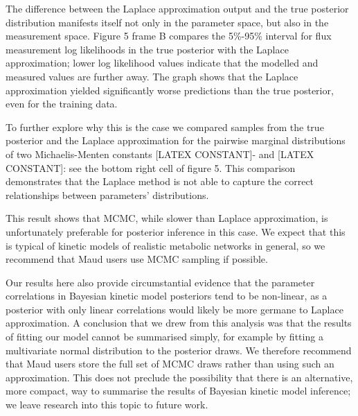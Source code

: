 \documentclass[journal=,manuscript=]{achemso}
\begin{document}
The difference between the Laplace approximation output and the true
posterior distribution manifests itself not only in the parameter space,
but also in the measurement space. Figure 5 frame B compares the
5\%-95\% interval for flux measurement log likelihoods in the true
posterior with the Laplace approximation; lower log likelihood values
indicate that the modelled and measured values are further away. The
graph shows that the Laplace approximation yielded significantly worse
predictions than the true posterior, even for the training data.

To further explore why this is the case we compared samples from the
true posterior and the Laplace approximation for the pairwise marginal
distributions of two Michaelis-Menten constants {[}LATEX CONSTANT{]}-
and {[}LATEX CONSTANT{]}: see the bottom right cell of figure 5. This
comparison demonstrates that the Laplace method is not able to capture
the correct relationships between parameters' distributions.

This result shows that MCMC, while slower than Laplace approximation, is
unfortunately preferable for posterior inference in this case. We expect
that this is typical of kinetic models of realistic metabolic networks
in general, so we recommend that Maud users use MCMC sampling if
possible.

Our results here also provide circumstantial evidence that the parameter
correlations in Bayesian kinetic model posteriors tend to be non-linear,
as a posterior with only linear correlations would likely be more
germane to Laplace approximation. A conclusion that we drew from this
analysis was that the results of fitting our model cannot be summarised
simply, for example by fitting a multivariate normal distribution to the
posterior draws. We therefore recommend that Maud users store the full
set of MCMC draws rather than using such an approximation. This does not
preclude the possibility that there is an alternative, more compact, way
to summarise the results of Bayesian kinetic model inference; we leave
research into this topic to future work.
\end{document}
